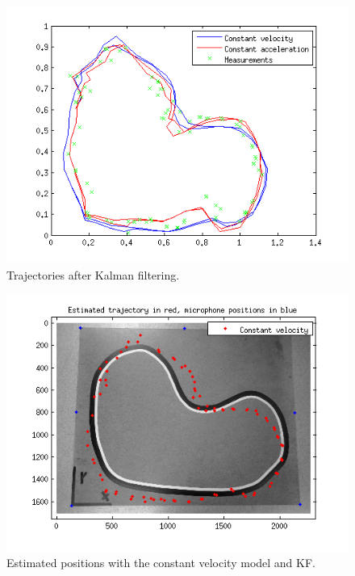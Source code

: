 \documentclass[10pt,a4paper]{report}
\begin{document}
\begin{figure}[H]
\begin{center}
  \includegraphics[width = 350pt]{kf_all.png}
  \caption{Trajectories after Kalman filtering.}
  \label{kf_all}
  \end{center}
\end{figure}
\begin{figure}[H]
\begin{center}
  \includegraphics[width = 350pt]{kf_CV.png}
  \caption{Estimated positions with the constant velocity model and KF.}
  \label{kf_CV}
  \end{center}
\end{figure}
\end{document}
